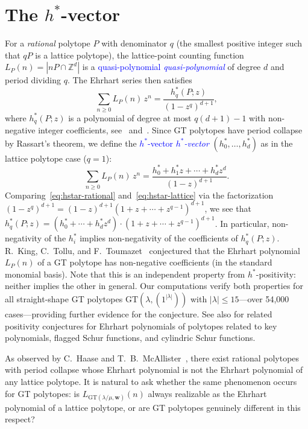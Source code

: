 \documentclass[11pt,reqno]{amsart}
\theoremstyle{definition}
\newcommand{\setZ}{\mathbb{Z}}
\newcommand{\GT}{\mathrm{GT}}
\newcommand{\lam}{\lambda}
\newcommand{\wt}{\mathbf{w}}
\newcommand{\Ehr}{L}
\newcommand{\defin}[1]{%
\relax\ifmmode%
\textcolor{blue}{#1}%
\else \textcolor{blue}{\emph{#1}}%
\fi%
}
\begin{document}
\section{The \texorpdfstring{$h^{*}$}{h*}-vector}\label{sec:hstar}

For a \emph{rational} polytope $P$ with denominator $q$
(the smallest positive integer such that $qP$ is a lattice polytope),
the lattice-point counting function $\Ehr_P(n) = |nP \cap \setZ^d|$ is a
\defin{quasi-polynomial} of degree $d$ and period dividing $q$.
The Ehrhart series then satisfies
\begin{equation}\label{eq:hstar-rational}
  \sum_{n \geq 0} \Ehr_P(n) \, z^n
  = \frac{h^*_q(P;z)}{(1-z^q)^{d+1}},
\end{equation}
where $h^*_q(P;z)$ is a polynomial of degree at most $q(d+1)-1$
with non-negative integer coefficients,
see~\cite{BeckSottile2007} and~\cite{Stanley1993}.
Since GT polytopes have period collapse by Rassart's theorem,
we define the \defin{$h^{*}$-vector} $(h^*_0, \dotsc, h^*_d)$
as in the lattice polytope case ($q=1$):
\begin{equation}\label{eq:hstar-lattice}
  \sum_{n \geq 0} \Ehr_P(n) \, z^n
  = \frac{h^*_0 + h^*_1 z + \dotsb + h^*_d z^d}{(1-z)^{d+1}}.
\end{equation}
Comparing~\eqref{eq:hstar-rational} and~\eqref{eq:hstar-lattice}
via the factorization
$(1-z^q)^{d+1} = (1-z)^{d+1}(1+z+\dotsb+z^{q-1})^{d+1}$,
we see that
$h^*_q(P;z) = (h^*_0 + \dotsb + h^*_d z^d) \cdot (1+z+\dotsb+z^{q-1})^{d+1}$.
In particular, non-negativity of the $h^*_i$
implies non-negativity of the coefficients of $h^*_q(P;z)$.
R.~King, C.~Tollu, and F.~Toumazet~\cite{KingTolluToumazet2004}
conjectured that the Ehrhart polynomial $\Ehr_P(n)$ of a GT polytope
has non-negative coefficients (in the standard monomial basis).
Note that this is an independent property from $h^*$-positivity:
neither implies the other in general.
Our computations verify both properties for all straight-shape GT
polytopes $\GT(\lam,(1^{|\lam|}))$ with $|\lam| \leq 15$---over
54{,}000 cases---providing further evidence for the
conjecture. 
See also \cite{AlexanderssonAlhajjar2018,AlexanderssonOguz2023x}
for related positivity conjectures for Ehrhart polynomials
of polytopes related to key polynomials,
flagged Schur functions, and cylindric Schur functions.

As observed by C.~Haase and T.~B.~McAllister~\cite{HaaseMcAllister2007},
there exist rational polytopes with period collapse whose Ehrhart
polynomial is not the Ehrhart polynomial of any lattice polytope.
It is natural to ask whether the same phenomenon occurs for GT
polytopes: is $\Ehr_{\GT(\lam/\mu, \wt)}(n)$ always realizable as
the Ehrhart polynomial of a lattice polytope, or are GT polytopes
genuinely different in this respect?
\end{document}
